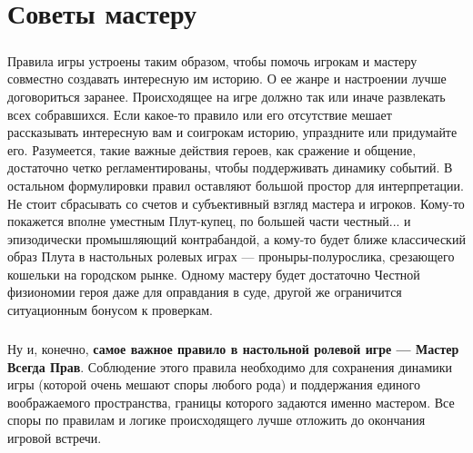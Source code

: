 \chapter{Советы мастеру}
\paragraph{}
Правила игры устроены таким образом, чтобы помочь игрокам и мастеру совместно создавать интересную им историю. О ее жанре и настроении лучше договориться заранее. Происходящее на игре должно так или иначе развлекать всех собравшихся. Если какое-то правило или его отсутствие мешает рассказывать интересную вам и соигрокам историю, упраздните или придумайте его. Разумеется, такие важные действия героев, как сражение и общение, достаточно четко регламентированы, чтобы поддерживать динамику событий. В остальном формулировки правил оставляют большой простор для интерпретации. Не стоит сбрасывать со счетов и субъективный взгляд мастера и игроков. Кому-то покажется вполне уместным Плут-купец, по большей части честный... и эпизодически промышляющий контрабандой, а кому-то будет ближе классический образ Плута в настольных ролевых играх — проныры-полурослика, срезающего кошельки на городском рынке. Одному мастеру будет достаточно Честной физиономии героя даже для оправдания в суде, другой же ограничится ситуационным бонусом к проверкам.
\paragraph{}
Ну и, конечно, \textbf{самое важное правило в настольной ролевой игре — Мастер Всегда Прав}. Соблюдение этого правила необходимо для сохранения динамики игры (которой очень мешают споры любого рода) и поддержания единого воображаемого пространства, границы которого задаются именно мастером. Все споры по правилам и логике происходящего лучше отложить до окончания игровой встречи.




